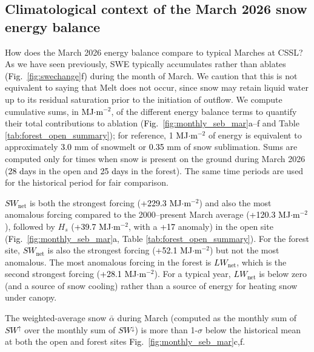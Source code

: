 \documentclass[draft]{agujournal2019}
\newcommand{\fig}[2]{\textcolor{black}{(Fig.~\ref{#1}{#2})}}   %
\newcommand{\fignop}[2]{\textcolor{black}{Fig.~\ref{#1}{#2}}}  %
\newcommand{\mynum}[1]{\textcolor{black}{#1}}
\newcommand{\lwnet}{\textcolor{black}{$LW_{\mathrm{net}}$}\xspace}
\newcommand{\swnet}{\textcolor{black}{$SW_{\mathrm{net}}$}\xspace}
\newcommand{\swdn}{\textcolor{black}{$SW^{\downarrow}$}\xspace}
\newcommand{\swup}{\textcolor{black}{$SW^{\uparrow}$}\xspace}
\newcommand{\mjmtwo}{\textcolor{black}{MJ$\cdot$m$^{-2}$}\xspace}
\begin{document}
\subsection{Climatological context of the March 2026 snow energy balance}\label{sec:climo_comparison}
%
How does the March 2026 energy balance compare to typical Marches at CSSL?
As we have seen previously, SWE typically accumulates rather than ablates \fig{fig:swechange}{f} during the month of March.
We caution that this is not equivalent to saying that Melt does not occur, since snow may retain liquid water up to its residual saturation prior to the initiation of outflow.
We compute cumulative sums, in \mjmtwo, of the different energy balance terms to quantify their total contributions to ablation (\fignop{fig:monthly_seb_mar}{a--f} and Table \ref{tab:forest_open_summary}); for reference, 1 \mjmtwo of energy is equivalent to approximately \mynum{3.0} mm of snowmelt or \mynum{0.35} mm of snow sublimation. 
Sums are computed only for times when snow is present on the ground during March 2026 (\mynum{28 days} in the open and \mynum{25 days} in the forest). 
The same time periods are used for the historical period for fair comparison.


\swnet is both the strongest forcing (\mynum{+229.3} \mjmtwo) and also the most anomalous forcing compared to the 2000--present March average (\mynum{+120.3} \mjmtwo), followed by $H_s$ (\mynum{+39.7} \mjmtwo, with a \mynum{+17} anomaly) in the open site (\fignop{fig:monthly_seb_mar}{a}, Table \ref{tab:forest_open_summary}).
For the forest site, \swnet is also the strongest forcing (\mynum{+52.1} \mjmtwo) but not the most anomalous.
The most anomalous forcing in the forest is \lwnet, which is the second strongest forcing (\mynum{+28.1} \mjmtwo).
For a typical year, \lwnet is below zero (and a source of snow cooling) rather than a source of energy for heating snow under canopy.

The weighted-average snow $\bar{\alpha}$ during March (computed as the monthly sum of \swup over the monthly sum of \swdn) is more than 1-$\sigma$ below the historical mean at both the open and forest sites \fignop{fig:monthly_seb_mar}{c,f}. 
\end{document}
